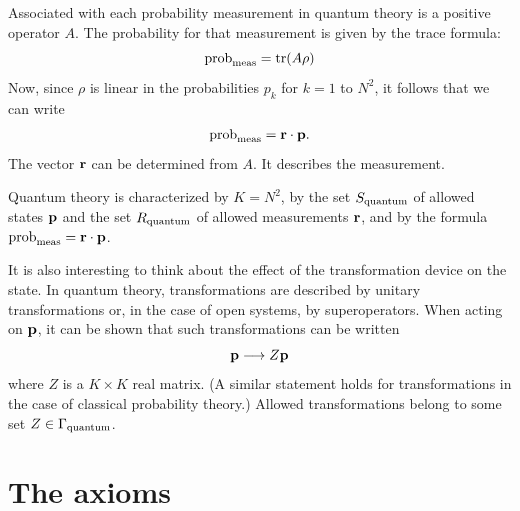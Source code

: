\documentclass[10pt]{article}
\begin{document}
Associated with each probability measurement in quantum theory is a
positive operator $A$.  The probability for that measurement is given by
the trace formula:
\begin{equation}
{\rm prob}_{\rm meas} = {\rm tr}(A\rho)
\end{equation}
Now, since $\rho$ is linear in the probabilities $p_k$ for $k=1$ to
$N^2$, it follows that we can write
\begin{equation}
{\rm prob}_{\rm meas} = {\bf r}\cdot {\bf p}.
\end{equation}
The vector ${\bf r}$ can be determined from $A$. It describes the
measurement.

Quantum theory is characterized by $K=N^2$,
by the set $S_{\rm quantum}$ of allowed states ${\bf p}$ and the set
$R_{\rm quantum}$ of allowed measurements ${\bf r}$,
and by the formula ${\rm prob}_{\rm meas}={\bf r}\cdot{\bf p}$.

It is also interesting to think about the effect of the transformation
device on the state.  In quantum theory, transformations are described by
unitary transformations or, in the case of open systems, by
superoperators.  When acting on ${\bf p}$, it can be shown that such
transformations can be written
\begin{equation}
{\bf p} \longrightarrow Z{\bf p}
\end{equation}
where $Z$ is a $K\times K$ real matrix.  (A similar statement holds for
transformations in the case of classical probability theory.)
Allowed transformations belong to some set $Z\in \Gamma_{\rm
quantum}$.

\section{The axioms}
\end{document}
